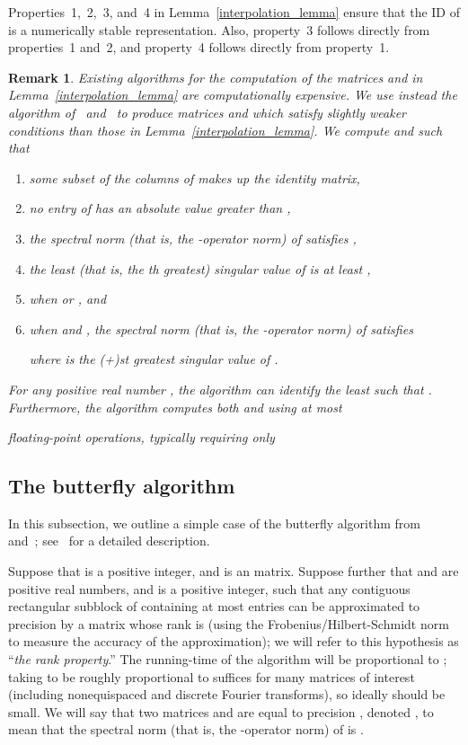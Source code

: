 \documentclass[final,3p,times]{elsarticle}
\newtheorem{remark1}[theorem]{Remark}
\newenvironment{remark}{\begin{remark1}\rm}{\end{remark1}}
\begin{document}
Properties~1,~2,~3, and~4 in Lemma~\ref{interpolation_lemma}
ensure that the ID 
of  is a numerically stable representation.
Also, property~3 follows directly from properties~1 and~2,
and property~4 follows directly from property~1.

\begin{remark}
\label{QR_algorithm}
Existing algorithms for the computation of the matrices 
and  in Lemma~\ref{interpolation_lemma}
are computationally expensive.
We use instead the algorithm of~\cite{cheng-gimbutas-martinsson-rokhlin}
and~\cite{gu-eisenstat96}
to produce matrices  and 
which satisfy slightly weaker conditions than those
in Lemma~\ref{interpolation_lemma}.
We compute  and  such that
\begin{enumerate}
\item some subset of the columns of  makes up
the  identity matrix,
\item \label{computable_bound1}
no entry of  has an absolute value greater than ,
\item the spectral norm (that is, the -operator norm) of 
satisfies
,
\item the least (that is, the th greatest) singular value
of  is at least ,
\item \label{exact}

when  or , and
\item when  and , the spectral norm
(that is, the -operator norm)
of 
satisfies

where  is the (+)st greatest singular value of .
\end{enumerate}
For any positive real number ,
the algorithm can identify the least  such that
.
Furthermore, the algorithm computes both  and 
using at most

floating-point operations, typically requiring only

\end{remark}


\subsection{The butterfly algorithm}
\label{butterfly}

In this subsection, we outline a simple case of the butterfly algorithm
from~\cite{michielssen-boag} and~\cite{oneil-woolfe-rokhlin};
see~\cite{oneil-woolfe-rokhlin} for a detailed description.

Suppose that  is a positive integer, and  is an  matrix.
Suppose further that  and  are positive real numbers,
and  is a positive integer, such that
any contiguous rectangular subblock of  containing at most  entries
can be approximated to precision  by a matrix whose rank is 
(using the Frobenius/Hilbert-Schmidt norm to measure the accuracy
of the approximation);
we will refer to this hypothesis as ``{\it the rank property}.''
The running-time of the algorithm will be proportional to ;
taking  to be roughly proportional to  suffices
for many matrices of interest
(including nonequispaced and discrete Fourier transforms),
so ideally  should be small.
We will say that two matrices  and  are equal
to precision ,
denoted , to mean that the spectral norm
(that is, the -operator norm) of 
is .
\end{document}
